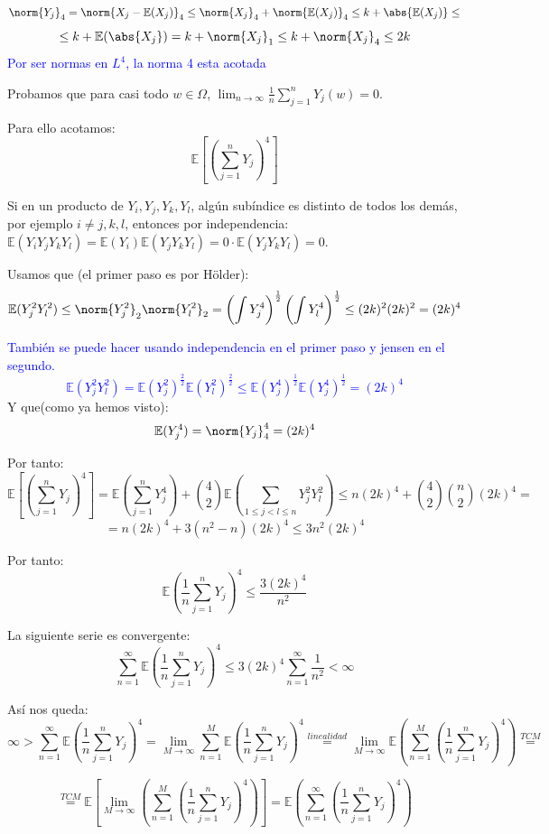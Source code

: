 \documentclass{apuntes}
\begin{document}
\[
\norm{Y_j}_4 = \norm{X_j - \mathbb{E}(X_j)}_4 \leq \norm{X_j}_4 + \norm{\mathbb{E}(X_j)}_4 \leq k + \abs{\mathbb{E}(X_j)} \leq
\]
\[
\leq k + \mathbb{E}(\abs{X_j}) = k + \norm{X_j}_1 \leq k + \norm{X_j}_4 \leq 2k
\]
\textcolor{blue}{Por ser normas en $L^4$, la norma 4 esta acotada}

Probamos que para casi todo $w \in \Omega$, $\lim_{n \rightarrow \infty} \frac{1}{n} \sum_{j=1}^{n}Y_j(w)=0$. 

Para ello acotamos:
\[
\mathbb{E}\left[ (\sum_{j=1}^{n} Y_j)^4 \right]
\] 

Si en un producto de $Y_i, Y_j, Y_k, Y_l$, algún subíndice es distinto de todos los demás, por ejemplo $i\neq j,k,l$, entonces por independencia: $\mathbb{E}(Y_i Y_j Y_k Y_l)=\mathbb{E}(Y_i)\mathbb{E}(Y_j Y_k Y_l) = 0 \cdot \mathbb{E}(Y_j Y_k Y_l) = 0$.

Usamos que (el primer paso es por Hölder):
\[
\mathbb{E}(Y_j^2 Y_l^2) \leq \norm{Y_j^2}_2 \norm{Y_l^2}_2 = \left( \int Y_j^4\right)^{\frac{1}{2}} \left( \int Y_l^4\right)^{\frac{1}{2}} \leq (2k)^2(2k)^2=(2k)^4 
\]

\textcolor{blue}{También se puede hacer usando independencia en el primer paso y jensen en el segundo.
\[
\mathbb{E}(Y_j^2 Y_l^2) = \mathbb{E}(Y_j^2)^\frac{2}{2} \mathbb{E}(Y_l^2)^\frac{2}{2} \leq \mathbb{E}(Y_j^4)^\frac{1}{2}\mathbb{E}(Y_j^4)^\frac{1}{2}=(2k)^4
\]
}
Y que(como ya hemos visto):
\[
\mathbb{E}(Y_j^4) = \norm{Y_j}_4^4=(2k)^4
\]

Por tanto:
\[
\mathbb{E}\left[(\sum_{j=1}^{n} Y_j)^4\right]= \mathbb{E}(\sum_{j=1}^{n} Y_j^4) + \binom{4}{2}\mathbb{E}(\sum_{1\leq j<l\leq n} Y_j^2 Y_l^2)\leq n(2k)^4 + \binom{4}{2}\binom{n}{2}(2k)^4 =
\]
\[
= n(2k)^4+3(n^2-n)(2k)^4 \leq 3n^2(2k)^4
\]

Por tanto:
\[
\mathbb{E}(\frac{1}{n}\sum_{j=1}^{n}Y_j)^4 \leq \frac{3(2k)^4}{n^2}
\]

La siguiente serie es convergente: 
\[
\sum_{n=1}^{\infty}\mathbb{E}(\frac{1}{n}\sum_{j=1}^{n}Y_j)^4 \leq 3(2k)^4 \sum_{n=1}^{\infty}\frac{1}{n^2} < \infty
\]

Así nos queda:
\[
\infty > \sum_{n=1}^{\infty}\mathbb{E}(\frac{1}{n}\sum_{j=1}^{n}Y_j)^4 = \lim_{M \rightarrow \infty}\sum_{n=1}^{M}\mathbb{E}(\frac{1}{n}\sum_{j=1}^{n}Y_j)^4 \stackrel{linealidad}{=} \lim_{M \rightarrow \infty} \mathbb{E}\left(\sum_{n=1}^{M}(\frac{1}{n}\sum_{j=1}^{n}Y_j)^4 \right) \stackrel{TCM}{=}
\]

\[
\stackrel{TCM}{=} \mathbb{E}\left[\lim_{M \rightarrow \infty}\left(\sum_{n=1}^{M}(\frac{1}{n}\sum_{j=1}^{n} Y_j)^4 \right)  \right] = \mathbb{E}\left(\sum_{n=1}^{\infty}(\frac{1}{n}\sum_{j=1}^{n} Y_j)^4 \right)
\]
\end{document}
